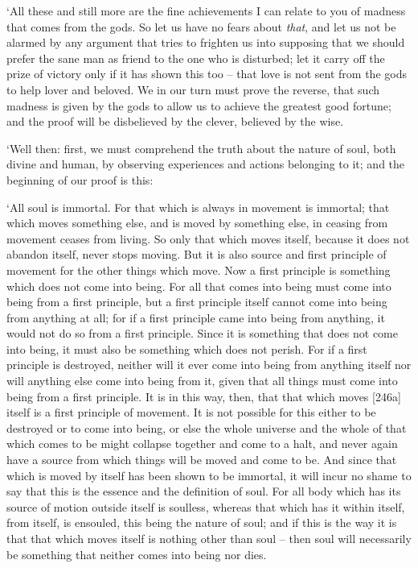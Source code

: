 ‘All these and still more are the fine achievements I can relate
 to you of madness that comes from the gods. So let us have no
fears about {\em that}, and let us not be alarmed by any argument that
tries to frighten us into supposing that we should prefer the sane man
as friend to the one who is disturbed; let it carry  off the
prize of victory only if it has shown this too -- that love is not sent
from the gods to help lover and beloved. We in our turn must prove the
reverse, that such madness is given by the  gods to allow us to
achieve the greatest good fortune; and the proof will be disbelieved by
the clever, believed by the wise.

‘Well then: first, we must comprehend the truth about the nature of
soul, both divine and human, by observing experiences and actions
belonging to it; and the beginning of our  proof is this:

‘All soul is immortal. For that which is always in movement is immortal;
that which moves something else, and is moved by something else, in
ceasing from movement ceases from living. So only that which moves
itself, because it does not abandon itself, never stops moving. But it
is also source and first principle  of movement for the other
things which move. Now a first  principle is something which
does not come into being. For all that comes into being must come into
being from a first principle, but a first principle itself cannot come
into being from anything at all; for if a first principle came into
being from anything, it would not do so from a first
principle. Since it is
something that does not come into being, it must also be something which
does not perish. For if a first principle is destroyed, neither will it
 ever come into being from anything itself nor will anything
else come into being from it, given that all things must come into being
from a first principle. It is in this way, then, that that which moves
{[}246a{]} itself is a first principle of movement. It is not possible
for this either to be destroyed or to come into being, or else the whole
universe and the whole of that which comes  to be might collapse
together and come to a halt, and never again have a source from which
things will be moved and come to be. And since that which is moved by
itself has been shown to be immortal, it will incur no shame to say that
this is the  essence and the definition of soul. For all body
which has its source of motion outside itself is soulless, whereas that
which has it within itself, from itself, is ensouled, this being the
nature of soul; and if this is the way it is that that which moves
itself is nothing other than soul -- then soul will necessarily be
something that neither comes into being nor dies.

